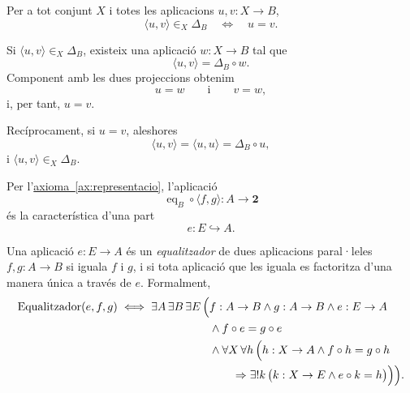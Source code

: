 \begin{proposicio}\label{prop:diagonal-igualtat}
Per a tot conjunt \(X\) i totes les aplicacions \(u,v:X\to B\),
\[
\langle u,v\rangle\in_X\Delta_B
\quad\Longleftrightarrow\quad
u=v.
\]
\end{proposicio}

\begin{prova}
Si \(\langle u,v\rangle\in_X\Delta_B\), existeix una aplicació \(w:X\to B\) tal que
\[
\langle u,v\rangle=\Delta_B\circ w.
\]
Component amb les dues projeccions obtenim
\[
u=w
\qquad\text{i}\qquad
v=w,
\]
i, per tant, \(u=v\).

Recíprocament, si \(u=v\), aleshores
\[
\langle u,v\rangle
=\langle u,u\rangle
=\Delta_B\circ u,
\]
i \(\langle u,v\rangle\in_X\Delta_B\).
\end{prova}

Per l'\hyperref[ax:representacio]{axioma~\ref*{ax:representacio}}, l'aplicació
\[
\operatorname{eq}_B\circ\langle f,g\rangle:A\to\mathbf2
\]
és la característica d'una part
\[
e:E\hookrightarrow A.
\]

\begin{definicio}[Equalitzador]\label{def:equalitzador}
Una aplicació \(e:E\to A\) és un \emph{equalitzador} de dues aplicacions paral·leles \(f,g:A\to B\) si iguala \(f\) i \(g\), i si tota aplicació que les iguala es factoritza d'una manera única a través de \(e\). Formalment,
\[
\begin{aligned}
\operatorname{Equalitzador}(e,f,g)
\iff
\exists A\,\exists B\,\exists E\,\Bigl(&
f:A\to B\land g:A\to B\land e:E\to A
\\
&{}\land f\circ e=g\circ e
\\
&{}\land\forall X\,\forall h\,
\Bigl(
 h:X\to A\land f\circ h=g\circ h
\\
&\qquad{}\Rightarrow
\exists!k\,\bigl(k:X\to E\land e\circ k=h\bigr)
\Bigr)
\Bigr).
\end{aligned}
\]
\end{definicio}

